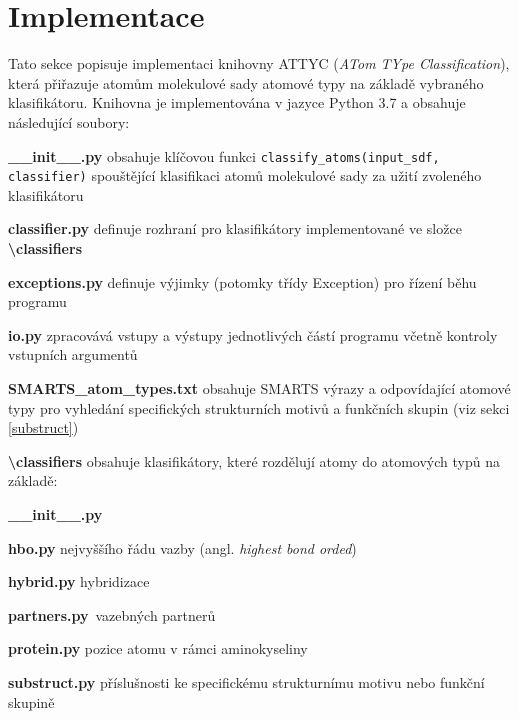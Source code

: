 \chapter{Implementace}
Tato sekce popisuje implementaci knihovny ATTYC (\textit{ATom TYpe Classification}), která přiřazuje atomům molekulové sady atomové typy na základě vybraného  klasifikátoru. Knihovna je implementována v jazyce Python 3.7 a obsahuje následující soubory:

\bigskip
\noindent \textbf{\_\_init\_\_.py}\hspace{0.5cm} obsahuje klíčovou funkci \verb|classify_atoms(input_sdf, classifier)| spouštějící klasifikaci atomů molekulové sady za užití zvoleného klasifikátoru


\noindent \textbf{classifier.py} definuje rozhraní pro klasifikátory implementované ve složce \textbf{\textbackslash classifiers}


\noindent \textbf{exceptions.py} definuje výjimky (potomky třídy Exception) pro řízení běhu programu


\noindent \textbf{io.py} zpracovává vstupy a výstupy jednotlivých částí programu včetně kontroly vstupních argumentů 


\noindent \textbf{SMARTS\_atom\_types.txt}\hspace{0.5cm} obsahuje SMARTS výrazy a odpovídající atomové typy pro vyhledání specifických strukturních motivů a funkčních skupin (viz sekci \ref{substruct})

\noindent\textbf{\textbackslash classifiers} obsahuje klasifikátory, které rozdělují atomy do atomových typů na základě:

\textbf{\_\_init\_\_.py}\hspace{0.5cm}

\textbf{hbo.py}\hspace{0.5cm} nejvyššího řádu vazby (angl. \textit{highest bond orded})

\textbf{hybrid.py}\hspace{0.5cm} hybridizace

\textbf{partners.py}\ vazebných partnerů

\textbf{protein.py} pozice atomu v rámci aminokyseliny

\textbf{substruct.py} příslušnosti ke specifickému strukturnímu motivu nebo funkční skupině

